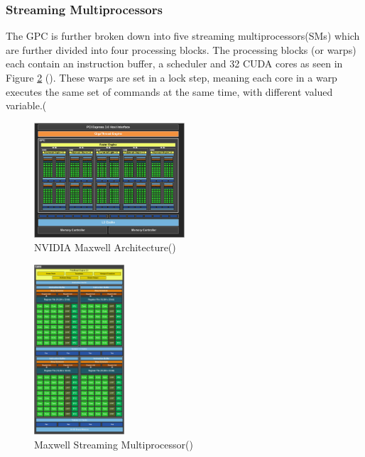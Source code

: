 \subsubsection{Streaming Multiprocessors}\label{gpu:ssec:smm}
The GPC is further broken down into five streaming multiprocessors(SMs) which are further divided into four processing blocks. The processing blocks (or warps) each contain an instruction buffer, a scheduler and 32 CUDA cores as seen in Figure \ref{gpu:img:smm} (\cite{GM107SMM}). These warps are set in a lock step, meaning each core in a warp executes the same set of commands at the same time, with different valued variable.(\cite{CUDA_DEVKIT}
%
\begin{figure}[H]
 \centering
 \includegraphics[width=0.5\textwidth]{Images/GM107.jpg}
 \caption{NVIDIA Maxwell Architecture(\cite{GM107})}
 \label{gpu:img:gm107}
\end{figure}
%
\begin{figure}[H]
\centering
 \includegraphics[width=0.3\textwidth]{Images/GM107SMM.png}
 \caption{Maxwell Streaming Multiprocessor(\cite{GM107SMM})}
 \label{gpu:img:smm}
\end{figure}

